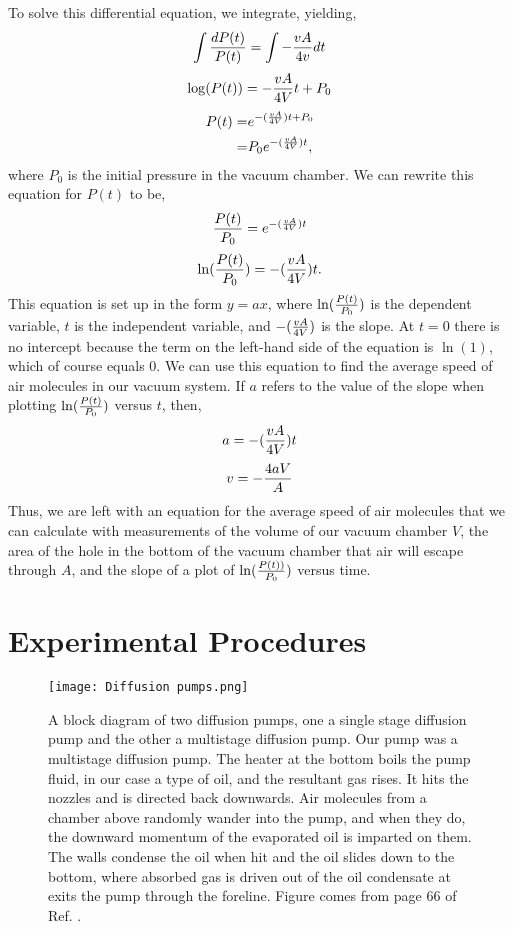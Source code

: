 \documentclass[11pt,letterpaper]{article}
\begin{document}
To solve this differential equation, we integrate, yielding,
\begin{equation}
    \int {dP(t) \over P(t)} = \int -{vA \over 4v} dt
\end{equation}
\begin{equation}
    \log(P(t)) = - {vA \over 4V} t + P_0   
\end{equation}
\begin{align}
    P(t) = & e ^{-({vA \over 4V}) t + P_0} \\
    = & P_0e ^{-({vA \over 4V}) t} ,
\end{align}
where $P_0$ is the initial pressure in the vacuum chamber. We can rewrite this equation for $P(t)$ to be,
\begin{equation}
    {P(t) \over P_0} = e^{-({vA \over 4V}) t}
\end{equation}
\begin{equation}
    \ln ({P(t) \over P_0}) = -({vA \over 4V}) t.
\end{equation}
This equation is set up in the form $y = ax$, where $\ln ({P(t) \over P_0})$ is the dependent variable, $t$ is the independent variable, and $-({vA \over 4V})$ is the slope. At $t=0$ there is no intercept because the term on the left-hand side of the equation is $\ln(1)$, which of course equals $0$. We can use this equation to find the average speed of air molecules in our vacuum system. If $a$ refers to the value of the slope when plotting $\ln ({P(t) \over P_0})$ versus $t$, then,
\begin{equation}
    a = -({vA \over 4V}) t
\end{equation}
\begin{equation}
    v = - {4aV \over A} \label{to find speed}
\end{equation}
Thus, we are left with an equation for the average speed of air molecules that we can calculate with measurements of the volume of our vacuum chamber $V$, the area of the hole in the bottom of the vacuum chamber that air will escape through $A$, and the slope of a plot of $\ln ({P(t)) \over P_0})$ versus time.



\section{Experimental Procedures}

\begin{figure}
\centerline{\texttt{[image: Diffusion pumps.png]}}
\caption{A block diagram of two diffusion pumps, one a single stage diffusion pump and the other a multistage diffusion pump. Our pump was a multistage diffusion pump. The heater at the bottom boils the pump fluid, in our case a type of oil, and the resultant gas rises. It hits the nozzles and is directed back downwards. Air molecules from a chamber above randomly wander into the pump, and when they do, the downward momentum of the evaporated oil is imparted on them. The walls condense the oil when hit and the oil slides down to the bottom, where absorbed gas is driven out of the oil condensate at exits the pump through the foreline. Figure comes from page 66 of Ref. \cite{Mark}.} \label{Diffusion pumps}
\end{figure}
\end{document}
